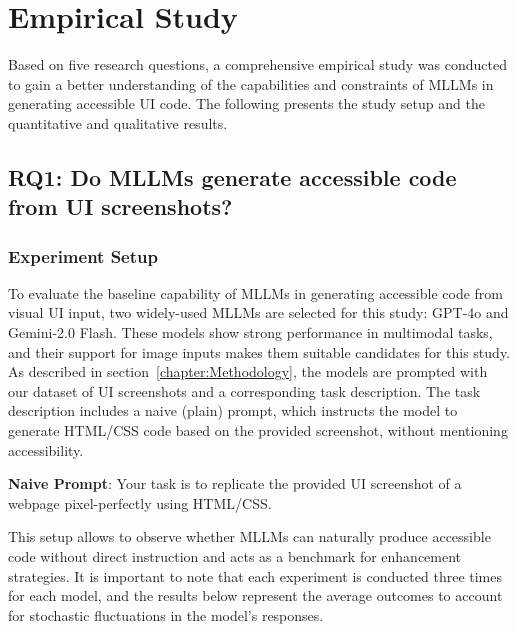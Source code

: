 \chapter{Empirical Study}\label{chapter:EmpiricalStudy}
Based on five research questions, a comprehensive empirical study 
was conducted to gain a better understanding of the 
capabilities and constraints of MLLMs in generating accessible UI code.
The following presents the study setup and the quantitative and
qualitative results.

\section{RQ1: Do MLLMs generate accessible code from UI screenshots?}
\subsection{Experiment Setup}
To evaluate the baseline capability of MLLMs in generating accessible
code from visual UI input, two widely-used MLLMs are 
selected for this study: GPT-4o and Gemini-2.0 Flash.
These models show strong performance in 
multimodal tasks, and their support for image inputs makes
them suitable candidates for this study.\newline
As described in section~\ref{chapter:Methodology}, the models are 
prompted with our dataset of UI screenshots and a corresponding 
task description. The task description includes a naive (plain)
prompt, which instructs the model to generate HTML/CSS code
based on the provided screenshot, without mentioning accessibility.


\begin{roundedbox}
\textbf{Naive Prompt}: Your task is to replicate 
the provided UI screenshot of a webpage pixel-perfectly using 
HTML/CSS.
\end{roundedbox}

This setup allows to observe whether MLLMs can 
naturally produce accessible code without direct instruction 
and acts as a benchmark for enhancement strategies. 
It is important to note that each experiment is conducted three 
times for each model, and the results below represent the average 
outcomes to account for stochastic fluctuations in the model's responses.


